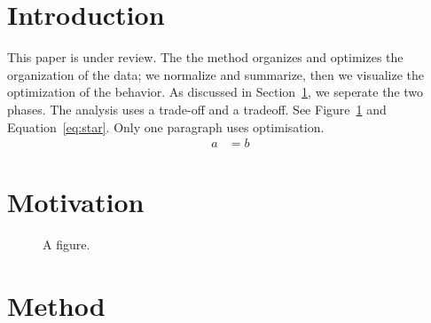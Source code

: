 \documentclass{article}
\begin{document}
\section{Introduction}\label{sec:intro}
This paper is under review. The the method organizes and optimizes the organization of the data; we normalize
and summarize, then we visualize the optimization of the behavior. As discussed in Section~\ref{sec:intro}, we
seperate the two phases. The analysis uses a trade-off and a tradeoff. See Figure~\ref{fig:a} and
Equation~\ref{eq:star}. Only one paragraph uses optimisation.
\begin{align*}
a &= b \label{eq:star}
\end{align*}
\section*{Motivation}
\lipsum[1]
\begin{figure}[h]
\centering
\label{fig:a}
\caption{A figure.}
\end{figure}
\noindent{}
\section{Method}
\lipsum[2]
\end{document}

